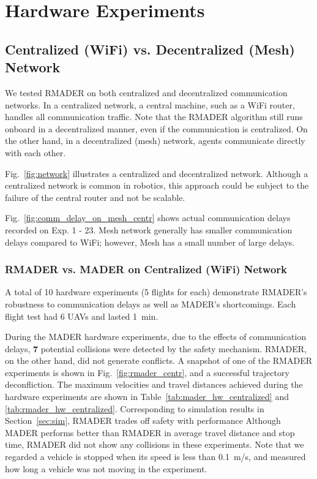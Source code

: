 \chapter{Hardware Experiments}

\section{Centralized (WiFi) vs. Decentralized (Mesh) Network}

We tested RMADER on both centralized and decentralized communication networks. In a centralized network, a central machine, such as a WiFi router, handles all communication traffic. Note that the RMADER algorithm still runs onboard in a decentralized manner, even if the communication is centralized. On the other hand, in a decentralized (mesh) network, agents communicate directly with each other. 

Fig.~\ref{fig:network} illustrates a centralized and decentralized network. Although a centralized network is common in robotics, this approach could be subject to the failure of the central router and not be scalable.

Fig.~\ref{fig:comm_delay_on_mesh_centr} shows actual communication delays recorded on Exp. 1 - 23. Mesh network generally has smaller communication delays compared to WiFi; however, Mesh has a small number of large delays. 

\subsection{RMADER vs. MADER on Centralized (WiFi) Network}
 A total of 10 hardware experiments (5 flights for each) demonstrate RMADER's robustness to communication delays as well as MADER's shortcomings. Each flight test had 6 UAVs and lasted \SI{1}{\minute}. 

During the MADER hardware experiments, due to the effects of communication delays, \textbf{7} potential collisions were detected by the safety mechanism. RMADER, on the other hand, did not generate conflicts. 
A snapshot of one of the RMADER experiments is shown in Fig.~\ref{fig:rmader_centr}, and a successful trajectory deconfliction.
The maximum velocities and travel distances achieved during the hardware experiments are shown in Table~\ref{tab:mader_hw_centralized} and \ref{tab:rmader_hw_centralized}. Corresponding to simulation results in Section~\ref{sec:sim}, RMADER trades off safety with performance \textemdash Although MADER performs better than RMADER in average travel distance and stop time, RMADER did not show any collisions in these experiments. Note that we regarded a vehicle is stopped when its speed is less than \SI{0.1}{\m/\s}, and measured how long a vehicle was not moving in the experiment.

